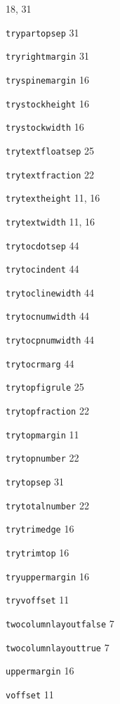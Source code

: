 \documentclass[11pt]{article}
\providecommand{\indexfill}{}
\providecommand{\alphaindexspace}[1]{\indexspace{\bfseries #1}}
\begin{document}
\begin{theindex}
   18, 31
\item \texttt  {\bs trypartopsep}  \indexfill
   31
\item \texttt  {\bs tryrightmargin}  \indexfill
   31
\item \texttt  {\bs tryspinemargin}  \indexfill
   16
\item \texttt  {\bs trystockheight}  \indexfill
   16
\item \texttt  {\bs trystockwidth}  \indexfill
   16
\item \texttt  {\bs trytextfloatsep}  \indexfill
   25
\item \texttt  {\bs trytextfraction}  \indexfill
   22
\item \texttt  {\bs trytextheight}  \indexfill
   11, 16
\item \texttt  {\bs trytextwidth}  \indexfill
   11, 16
\item \texttt  {\bs trytocdotsep}  \indexfill
   44
\item \texttt  {\bs trytocindent}  \indexfill
   44
\item \texttt  {\bs trytoclinewidth}  \indexfill
   44
\item \texttt  {\bs trytocnumwidth}  \indexfill
   44
\item \texttt  {\bs trytocpnumwidth}  \indexfill
   44
\item \texttt  {\bs trytocrmarg}  \indexfill
   44
\item \texttt  {\bs trytopfigrule}  \indexfill
   25
\item \texttt  {\bs trytopfraction}  \indexfill
   22
\item \texttt  {\bs trytopmargin}  \indexfill
   11
\item \texttt  {\bs trytopnumber}  \indexfill
   22
\item \texttt  {\bs trytopsep}  \indexfill
   31
\item \texttt  {\bs trytotalnumber}  \indexfill
   22
\item \texttt  {\bs trytrimedge}  \indexfill
   16
\item \texttt  {\bs trytrimtop}  \indexfill
   16
\item \texttt  {\bs tryuppermargin}  \indexfill
   16
\item \texttt  {\bs tryvoffset}  \indexfill
   11
\item \texttt  {\bs twocolumnlayoutfalse}  \indexfill
   7
\item \texttt  {\bs twocolumnlayouttrue}  \indexfill
   7

\alphaindexspace{U}


\item \texttt  {\bs uppermargin}  \indexfill
   16

\alphaindexspace{V}


\item \texttt  {\bs voffset}  \indexfill
   11

\end{theindex}
\end{document}
